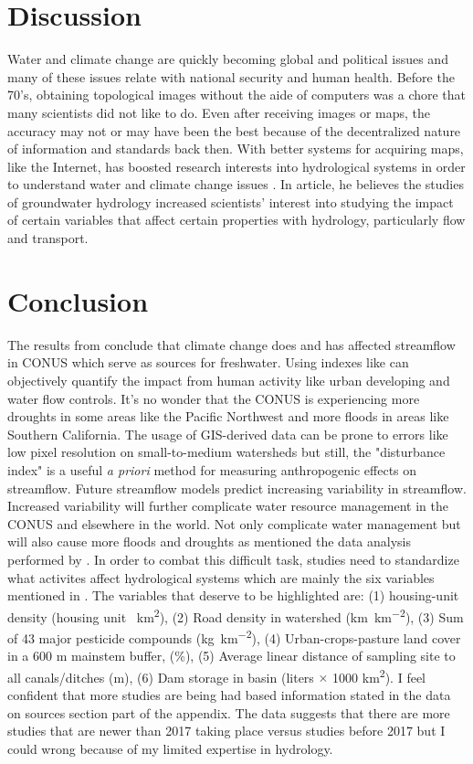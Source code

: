 \documentclass[a4paper,man,biblatex]{apa7}
\begin{document}
\section{Discussion} Water and climate change are quickly becoming global and political issues and many of these issues relate with national security and human health. Before the 70's, obtaining topological images without the aide of computers was a chore that many scientists did not like to do. Even after receiving images or maps, the accuracy may not or may have been the best because of the decentralized nature of information and standards back then. With better systems for acquiring maps, like the Internet, has boosted research interests into hydrological systems in order to understand water and climate change issues \autocite{bras_1999}. In \textcite{bras_1999} article, he believes the studies of groundwater hydrology increased scientists' interest into studying the impact of certain variables that affect certain properties with hydrology, particularly flow and transport.\\
\section{Conclusion} The results from \textcite{rice_2016} conclude that climate change does and has affected streamflow in CONUS which serve as sources for freshwater. Using indexes like \textcite{falcone_2016} can objectively quantify the impact from human activity like urban developing and water flow controls. It's no wonder that the CONUS is experiencing more droughts in some areas like the Pacific Northwest and more floods in areas like Southern California. The usage of GIS-derived data can be prone to errors like low pixel resolution on small-to-medium watersheds but still, the "disturbance index" is a useful \textit{a priori} method for measuring anthropogenic effects on streamflow. Future streamflow models predict increasing variability in streamflow. Increased variability will further complicate  water resource management in the CONUS and elsewhere in the world. Not only complicate water management but will also cause more floods and droughts as mentioned the data analysis performed by \textcite{mallakpour_2018}. In order to combat this difficult task, studies need to standardize what activites affect hydrological systems which are mainly the six variables mentioned in \textcite{rice_2016}. The variables that deserve to be highlighted are: (1) housing-unit density (housing unit \si{\per\square\kilo\meter}), (2) Road density in watershed (\si{\kilo\meter\per\square\kilo\meter}), (3) Sum of 43 major pesticide compounds (\si{\kilo\gram\per\square\kilo\meter}), (4) Urban-crops-pasture land cover in a 600 m mainstem buffer, (\%), (5) Average linear distance of sampling site to all canals/ditches (m), (6) Dam storage in basin (liters $\times$ 1000 \si{\square\kilo\meter}). I feel confident that more studies are being had based information stated in the data on sources section part of the appendix. The data suggests that there are more studies that are newer than 2017 taking place versus studies before 2017 but I could wrong because of my limited expertise in hydrology.
\end{document}

